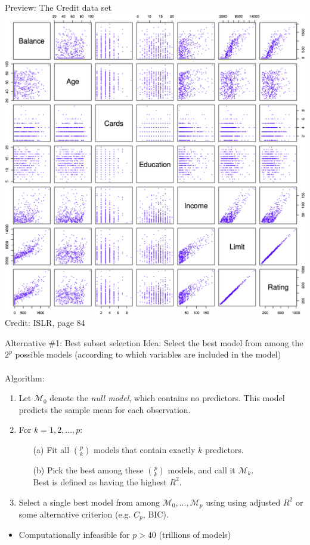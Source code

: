 \documentclass{beamer}
\begin{document}
  \begin{frame}{Preview: The Credit data set}
    \centering
    \includegraphics[height = 0.84\textheight]{images/credit.png}
    \footnotesize Credit: ISLR, page 84
  \end{frame}

  \begin{frame}{Alternative \#1: Best subset selection}
    Idea: Select the best model from among the $2^p$ possible models (according to which variables are included in the model)\\
    ~\\
    Algorithm:
    \begin{enumerate}
      \item Let $\mathcal{M}_0$ denote the {\it null model}, which contains no predictors. This model predicts the sample mean for each observation.
      \item For $k = 1, 2, ..., p$:
      \begin{itemize}
        \item[(a)] Fit all $\binom{p}{k}$ models that contain exactly $k$ predictors.
        \item[(b)] Pick the best among these $\binom{p}{k}$ models, and call it $\mathcal{M}_k$.\\
          Best is defined as having the highest $R^2$.
      \end{itemize}
      \item Select a single best model from among $\mathcal{M}_0, ..., \mathcal{M}_p$ using using adjusted $R^2$ or some alternative criterion (e.g. $C_p$, BIC).
    \end{enumerate}
    \begin{itemize}
      \item Computationally infeasible for $p > 40$ (trillions of models)
    \end{itemize}
  \end{frame}
\end{document}
